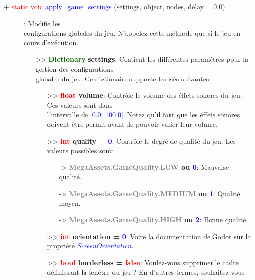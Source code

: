 \documentclass[a4paper, 11pt]{article}
\begin{document}
	\newpage \begin{description}
		\item [+ \textcolor{red}{static void} \textcolor{blue}{apply\_game\_settings} (settings, object,
		nodes, delay = 0.0)]: Modifie les \\configurations globales du jeu. N'appelez cette méthode que si 
		le jeu en cours d'exécution.
		\begin{itemize}
			\item[>> \textbf{\textcolor{darkgreen}{Dictionary} settings}:] Contient les différentes
			paramètres pour la gestion des configurations \\globales du jeu. Ce dictionaire supporte les
			clés suivantes:
			\begin{itemize}
				\item[>> \textbf{\textcolor{red}{float} volume}:] Contrôle le volume des éffets sonores du 
				jeu. Ces valeurs sont dans \\l'intervalle de [\textcolor{blue}{0.0}; \textcolor{blue}
				{100.0}]. Notez qu'il faut que les éffets sonores doivent être permit avant de pouvoir 
				varier leur volume.\\
				\item[>> \textbf{\textcolor{red}{int} quality = \textcolor{blue}{0}}:] Contrôle le degré de 
				qualité du jeu. Les valeurs possibles sont:
				\begin{itemize}
					\item [-> \textbf{\textcolor{gray}{MegaAssets.GameQuality.LOW} ou \textcolor{blue}{0}}:] 
					Mauvaise qualité.
					\item [-> \textbf{\textcolor{gray}{MegaAssets.GameQuality.MEDIUM} ou \textcolor{blue}
					{1}}:] Qualité moyen.
					\item [-> \textbf{\textcolor{gray}{MegaAssets.GameQuality.HIGH} ou \textcolor{blue}
					{2}}:] Bonne qualité.\\
				\end{itemize}
				\item[>> \textbf{\textcolor{red}{int} orientation = \textcolor{blue}{0}}:] Voire la
				documentation de Godot sur la propriété \href{https://docs.godotengine.org/en/stable/classes/class_os.html#class-os-property-screen-orientation}{\textit{\textcolor{blue}{ScreenOrientation}}}.\\
				\item[>> \textbf{\textcolor{red}{bool} borderless = \textcolor{red}{false}}:] Voulez-vous 
				supprimer le cadre définissant la fenêtre du jeu ? En d'autres termes, souhaitez-vous 

\end{itemize}
\end{itemize}
\end{description}
\end{document}
